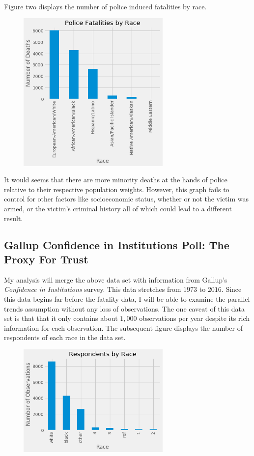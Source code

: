 \documentclass{article}
\begin{document}
\paragraph{}Figure two displays the number of police induced fatalities by race. 

\begin{figure}[h!]
\includegraphics[width=75mm,scale=0.1]{Race.png}
\centering
\caption{}
\end{figure}

It would seems that there are more minority deaths at the hands of police relative to their respective population weights. However, this graph fails to control for other factors like socioeconomic status, whether or not the victim was armed, or the victim's criminal history all of which could lead to a different result. 

\pagebreak

\subsection{Gallup Confidence in Institutions Poll: The Proxy For Trust}

My analysis will merge the above data set with information from Gallup's \textit{Confidence in Institutions} survey. This data stretches from $1973$ to $2016$. Since this data begins far before the fatality data, I will be able to examine the parallel trends assumption without any loss of observations. The one caveat of this data set is that that it only contains about $1,000$ observations per year despite its rich information for each observation. The subsequent figure displays the number of respondents of each race in the data set.

\pagebreak

\begin{figure}[h!]
\includegraphics[width=75mm,scale=0.1]{Race_Respondents.png}
\centering
\caption{}
\end{figure}
\end{document}

